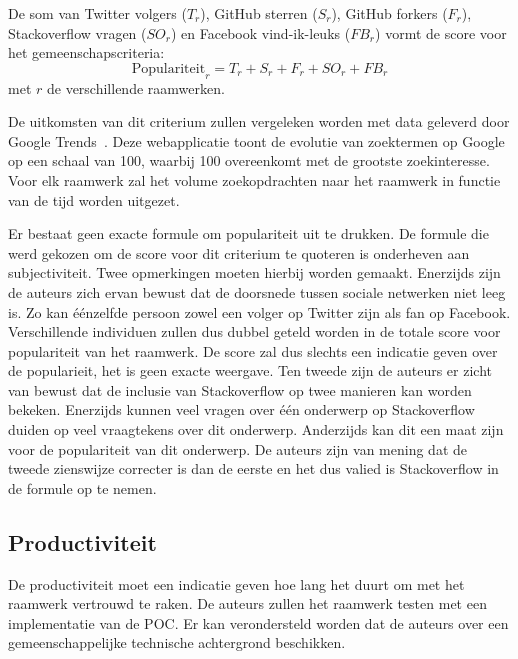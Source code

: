 De som van Twitter volgers ($T_r$), GitHub sterren ($S_r$), GitHub forkers ($F_r$), Stackoverflow vragen ($SO_r$) en Facebook vind-ik-leuks ($FB_r$) vormt de score voor het gemeenschapscriteria:
\begin{equation}
  \text{Populariteit}_r=T_r+S_r+F_r+SO_r+FB_r
  \label{eq:populariteit}
\end{equation}
met $r$ de verschillende raamwerken.

De uitkomsten van dit criterium zullen vergeleken worden met data geleverd door Google Trends~\cite{Google2012a}.
Deze webapplicatie toont de evolutie van zoektermen op Google op een schaal van 100, waarbij 100 overeenkomt met de grootste zoekinteresse.
Voor elk raamwerk zal het volume zoekopdrachten naar het raamwerk in functie van de tijd worden uitgezet.

  Er bestaat geen exacte formule om populariteit uit te drukken.
De formule die werd gekozen om de score voor dit criterium te quoteren is onderheven aan subjectiviteit.
Twee opmerkingen moeten hierbij worden gemaakt.
Enerzijds zijn de auteurs zich ervan bewust dat de doorsnede tussen sociale netwerken niet leeg is.
Zo kan éénzelfde persoon zowel een volger op Twitter zijn als fan op Facebook.
Verschillende individuen zullen dus dubbel geteld worden in de totale score voor populariteit van het raamwerk.
De score zal dus slechts een indicatie geven over de popularieit,  het is geen exacte weergave.
Ten tweede zijn de auteurs er zicht van bewust dat de inclusie van Stackoverflow op twee manieren kan worden bekeken.
Enerzijds kunnen veel vragen over één onderwerp op Stackoverflow duiden op veel vraagtekens over dit onderwerp.
Anderzijds kan dit een maat zijn voor de populariteit van dit onderwerp.
De auteurs zijn van mening dat de tweede zienswijze correcter is dan de eerste en het dus valied is Stackoverflow in de formule op te nemen.


\subsection{Productiviteit}
\label{sec:vergelijking-productiviteit}
De productiviteit moet een indicatie geven hoe lang het duurt om met het raamwerk vertrouwd te raken.
De auteurs zullen het raamwerk testen met een implementatie van de POC.
Er kan verondersteld worden dat de auteurs over een gemeenschappelijke technische achtergrond beschikken.

